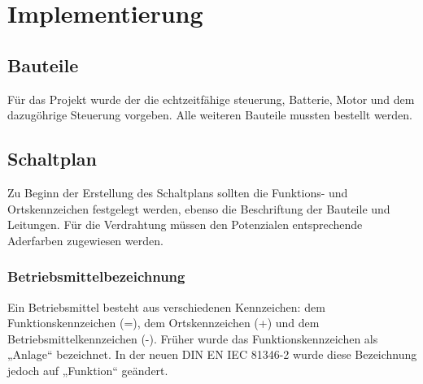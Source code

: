 \chapter{Implementierung}

\section{Bauteile}

Für das Projekt wurde der die echtzeitfähige steuerung, Batterie,  Motor und dem dazugöhrige Steuerung vorgeben.  Alle weiteren Bauteile mussten bestellt werden.

\section{Schaltplan}








Zu Beginn der Erstellung des Schaltplans sollten die Funktions- und Ortskennzeichen festgelegt werden, ebenso die Beschriftung der Bauteile und Leitungen. Für die Verdrahtung müssen den Potenzialen entsprechende Aderfarben zugewiesen werden.

\subsection{Betriebsmittelbezeichnung}

Ein Betriebsmittel besteht aus verschiedenen Kennzeichen: dem Funktionskennzeichen (=), dem Ortskennzeichen (+) und dem Betriebsmittelkennzeichen (-). Früher wurde das Funktionskennzeichen als „Anlage“ bezeichnet. In der neuen DIN EN IEC 81346-2 \cite{DIN_EN_IEC_81346-2} wurde diese Bezeichnung jedoch auf „Funktion“ geändert.

